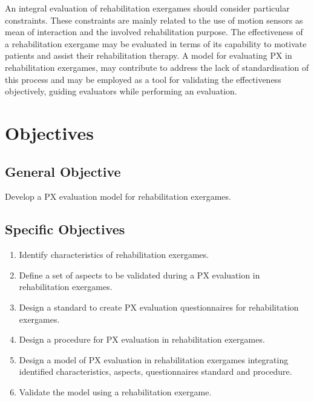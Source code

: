 An integral evaluation of rehabilitation exergames should consider particular constraints. These constraints are mainly related to the use of motion sensors as mean of interaction \autocite{Wiemeyer2015,Nijholt2008} and the involved rehabilitation purpose. The effectiveness of a rehabilitation exergame may be evaluated in terms of its capability to motivate patients and assist their rehabilitation therapy. A model for evaluating \ac{PX} in rehabilitation exergames, may contribute to address the lack of standardisation of this process and may be employed as a tool for validating the effectiveness objectively, guiding evaluators while performing an evaluation.




\section{Objectives}\label{sec:objectives}

\subsection{General Objective} 
Develop a \ac{PX} evaluation model for rehabilitation exergames.

\subsection{Specific Objectives}
\begin{enumerate}
\item Identify characteristics of rehabilitation exergames.
\item Define a set of aspects to be validated during a \ac{PX} evaluation in rehabilitation exergames.
\item Design a standard to create \ac{PX} evaluation questionnaires for rehabilitation exergames.
\item Design a procedure for \ac{PX} evaluation in rehabilitation exergames.
\item Design a model of \ac{PX} evaluation in rehabilitation exergames integrating identified characteristics, aspects, questionnaires standard and procedure.
\item Validate the model using a rehabilitation exergame.
\end{enumerate}





